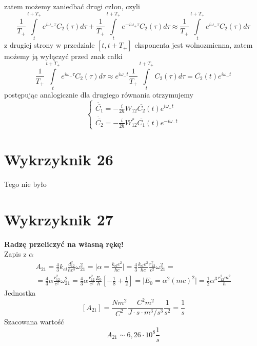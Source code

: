 \documentclass[a4paper,12pt]{article}
\begin{document}
	zatem możemy zaniedbać drugi człon, czyli
	$$
	\frac{1}{T_+}\int\limits_t^{t+T_+}e^{i\omega_{-}\tau}C_2(\tau)d\tau + \frac{1}{T_+}\int\limits_t^{t+T_+}e^{-i\omega_{+}\tau}C_2(\tau)d\tau \approx
	\frac{1}{T_+}\int\limits_t^{t+T_+}e^{i\omega_{-}\tau}C_2(\tau)d\tau
	$$
	z drugiej strony w przedziale $[t,t+T_+]$ eksponenta jest wolnozmienna, zatem możemy ją wyłączyć przed znak całki
	$$
	\frac{1}{T_+}\int\limits_t^{t+T_+}e^{i\omega_{-}\tau}C_2(\tau)d\tau \approx e^{i\omega_{-}t}\frac{1}{T_+}\int\limits_t^{t+T_+}C_2(\tau)d\tau  = \overline{C_2}(t)e^{i\omega_{-}t}
	$$
	postępując analogicznie dla drugiego równania otrzymujemy
	$$
	\left\{\begin{gathered}
		\dot{\overline{C_1}} = -\frac{i}{2\hbar}W_{12} \overline{C_2}(t)e^{i\omega_{-}t}\\
		\dot{\overline{C_2}} =  -\frac{i}{2\hbar}W_{12}^* \overline{C_1}(t)e^{-i\omega_{-}t}
	\end{gathered} \right.
	$$

\section{Wykrzyknik 26}
Tego nie było

\section{Wykrzyknik 27}
\textbf{Radzę przeliczyć na własną rękę!}\\
	Zapis z $\alpha$
	$$
	\begin{gathered}
		A_{21} = \frac{4}{3}k_{el}\frac{d_{12}^2}{\hbar c^3}\omega_{21}^2 = \bigg\vert \alpha = \frac{k_{el} e^2}{\hbar c} \bigg\vert = \frac{4}{3} \frac{k_{el} e^2}{\hbar c}
				\frac{r_{12}^2}{c^2}\omega_{21}^2 =\\
				=\frac{4}{3} \alpha \frac{r_{12}^2}{c^2}\omega_{21}^2 = \frac{4}{3} \alpha \frac{r_{12}^2}{c^2} \frac{E_0}{\hbar}\left[-\frac{1}{8}+\frac{1}{2}\right] = 
				\bigg\vert E_0 = \alpha^2 (mc)^2\bigg\vert = \frac{1}{2}\alpha^3 \frac{r_{12}^2m^2}{\hbar}
	\end{gathered}
	$$
	Jednostka
	$$
	[A_{21}] = \frac{Nm^2}{C^2}\frac{C^2 m^2}{J\cdot s\cdot m^3/s^3}\frac{1}{s^2} = \frac{1}{s}
	$$
	Szacowana wartość
	$$
	A_{21} \sim 6,26 \cdot10^{8} \frac{1}{s}
	$$
\end{document}
